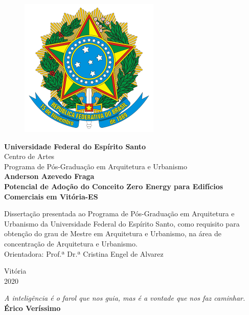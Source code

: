 \begin{titlepage}
\begin{center}
        \begin{figure}
            \thispagestyle{empty} %
            \centering
            \includegraphics[scale=1.15]{figures/brasao-rep-br.png}
	\end{figure}
        \vspace*{0.1cm}
        \textbf{\large Universidade Federal do Espírito Santo}\\
        \large Centro de Artes\\
        \large Programa de Pós-Graduação em Arquitetura e Urbanismo\\
        \vspace*{3cm}
        \textbf{\large Anderson Azevedo Fraga}\\
        \vspace*{4cm}
        \textbf{Potencial de Adoção do Conceito Zero Energy para Edifícios Comerciais em Vitória-ES}\\
        \vspace*{1cm}
            \hfill\begin{minipage}{0.5\linewidth}
            \normalsize Dissertação presentada ao Programa
            de Pós-Graduação em Arquitetura e
            Urbanismo da Universidade Federal do
            Espírito Santo, como requisito para
            obtenção do grau de Mestre em
            Arquitetura e Urbanismo, na área de
            concentração de Arquitetura e
            Urbanismo.\\
            Orientadora: Prof.ª Dr.ª Cristina Engel de
            Alvarez
            \end{minipage}            
        \vfill %
        Vitória\\
        2020\pagebreak

	\pagebreak

        \pagebreak
        
        \thispagestyle{empty}
        \vspace*{\fill}
        \begin{flushright}
            \textit{\itshape \normalsize A inteligência é o farol que nos guia, mas é a vontade que nos faz caminhar.}\\
            \textbf{\normalsize Érico Veríssimo}
        \end{flushright}
        
    \end{center}
\end{titlepage}
